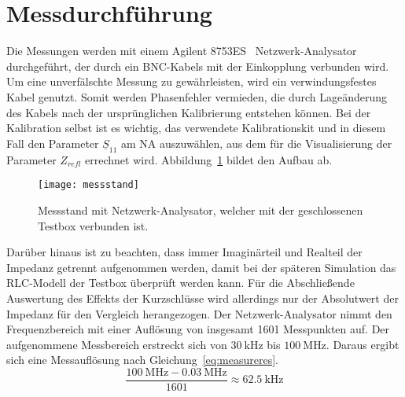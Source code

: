 \section{Messdurchf\"uhrung}
Die Messungen werden mit einem Agilent 8753ES~\citep{agilent2000} Netzwerk-Analysator durchgef\"uhrt, der durch ein BNC-Kabels mit der Einkopplung verbunden wird. Um eine unverf\"alschte Messung zu gew\"ahrleisten, wird ein verwindungsfestes Kabel genutzt. Somit werden Phasenfehler vermieden, die durch Lage\"anderung des Kabels nach der urspr\"unglichen Kalibrierung entstehen k\"onnen. Bei der Kalibration selbst ist es wichtig, das verwendete Kalibrationskit und in diesem Fall den Parameter $\underline{S}_{11}$ am NA auszuw\"ahlen, aus dem für die Visualisierung der Parameter $Z_{refl}$ errechnet wird. Abbildung~\ref{fig:messstand} bildet den Aufbau ab.
\par
\begin{figure}[htb]
	\centering
	\texttt{[image: messstand]}
	\caption{Messstand mit Netzwerk-Analysator, welcher mit der geschlossenen Testbox verbunden ist.}
	\label{fig:messstand}
\end{figure}

Dar\"uber hinaus ist zu beachten, dass immer Imagin\"arteil und Realteil der Impedanz getrennt aufgenommen werden, damit bei der sp\"ateren Simulation das RLC-Modell der Testbox \"uberpr\"uft werden kann. F\"ur die Abschlie\ss{}ende Auswertung des Effekts der Kurzschl\"usse wird allerdings nur der Absolutwert der Impedanz f\"ur den Vergleich herangezogen. Der Netzwerk-Analysator nimmt den Frequenzbereich mit einer Aufl\"osung von insgesamt 1601 Messpunkten auf. Der aufgenommene Messbereich erstreckt sich von $\SI{30}{\kilo\hertz}$ bis $\SI{100}{\mega\hertz}$. Daraus ergibt sich eine Messaufl\"osung nach Gleichung~\ref{eq:measureres}.
\begin{equation}
	\frac{\SI{100}{\mega\hertz} - \SI{0,03}{\mega\hertz} }{1601} \approx \SI{62,5}{\kilo\hertz} 
	\label{eq:measureres}
\end{equation}


